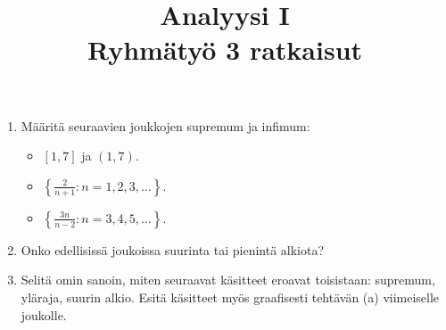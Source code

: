 \documentclass[11pt,a4paper]{amsart}
\title{Analyysi I\\Ryhmätyö 3 ratkaisut}
\author{}
\date{}
\begin{document}

\begin{exercise}
  \leavevmode\par
\begin{enumerate}[label=\alph*), nosep]
  \item Määritä seuraavien joukkojen supremum ja infimum:
    \begin{itemize}[nosep]
      \item \([1,7]\) ja \((1,7)\).
      \item \(\left\{\frac{2}{n + 1} \colon n = 1,2,3,\ldots\right\}\).
      \item \(\left\{\frac{3n}{n - 2} \colon n = 3,4,5,\ldots\right\}\).
    \end{itemize}
  \item Onko edellisissä joukoissa suurinta tai pienintä alkiota?
  \item Selitä omin sanoin, miten seuraavat käsitteet eroavat toisistaan:
    supremum, yläraja, suurin alkio. Esitä käsitteet myös graafisesti
    tehtävän (a) viimeiselle joukolle.
\end{enumerate}
\end{exercise}
\end{document}
